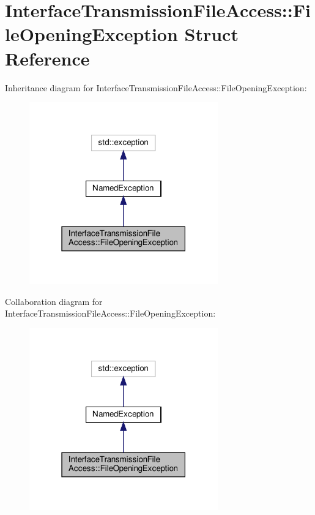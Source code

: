 \hypertarget{structInterfaceTransmissionFileAccess_1_1FileOpeningException}{}\section{Interface\+Transmission\+File\+Access\+:\+:File\+Opening\+Exception Struct Reference}
\label{structInterfaceTransmissionFileAccess_1_1FileOpeningException}


Inheritance diagram for Interface\+Transmission\+File\+Access\+:\+:File\+Opening\+Exception\+:\nopagebreak
\begin{figure}[H]
\begin{center}
\leavevmode
\includegraphics[width=231pt]{d5/ddb/structInterfaceTransmissionFileAccess_1_1FileOpeningException__inherit__graph}
\end{center}
\end{figure}


Collaboration diagram for Interface\+Transmission\+File\+Access\+:\+:File\+Opening\+Exception\+:\nopagebreak
\begin{figure}[H]
\begin{center}
\leavevmode
\includegraphics[width=231pt]{de/dbd/structInterfaceTransmissionFileAccess_1_1FileOpeningException__coll__graph}
\end{center}
\end{figure}

